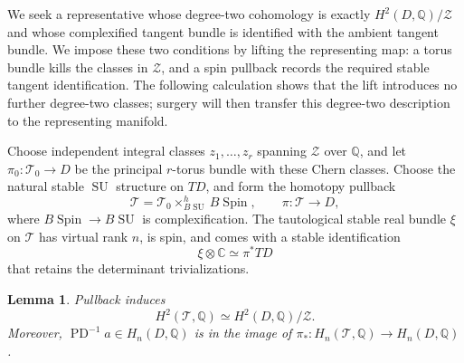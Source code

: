 \documentclass[11pt]{article}
\numberwithin{equation}{section}
\newtheorem{lemma}[theorem]{Lemma}
\theoremstyle{definition}
\theoremstyle{remark}
\begin{document}
We seek a representative whose degree-two cohomology is exactly
$H^2(D,\mathbb Q)/\mathcal Z$ and whose complexified tangent bundle is
identified with the ambient tangent bundle.  We impose these two
conditions by lifting the representing map: a torus bundle kills
the classes in $\mathcal Z$, and a spin pullback records the required
stable tangent identification.  The following calculation shows that
the lift introduces no further degree-two classes; surgery will then
transfer this degree-two description to the representing manifold.

Choose independent integral classes $z_1,\ldots,z_r$ spanning
$\mathcal Z$ over $\mathbb Q$, and let
$\pi_0:\mathscr T_0\to D$ be the principal $r$-torus bundle with these
Chern classes.  Choose the natural stable $\operatorname{SU}$ structure on $TD$, and
form the homotopy pullback
\[
 \mathscr T=\mathscr T_0\times^{h}_{B\operatorname{SU}}B\operatorname{Spin},
 \qquad \pi:\mathscr T\longrightarrow D,
\]
where $B\operatorname{Spin}\to B\operatorname{SU}$ is complexification.  The tautological stable
real bundle $\xi$ on $\mathscr T$ has virtual rank $n$, is spin, and
comes with a stable identification
\begin{equation}\label{topo:tautological}
 \xi\otimes\mathbb C\simeq\pi^*TD
\end{equation}
that retains the determinant trivializations.

\begin{lemma}\label{topo:lift}
Pullback induces
\[
 H^2(\mathscr T,\mathbb Q)\simeq H^2(D,\mathbb Q)/\mathcal Z.
\]
Moreover, $\operatorname{PD}^{-1}a\in H_n(D,\mathbb Q)$ is in the image of
$\pi_*:H_n(\mathscr T,\mathbb Q)\to H_n(D,\mathbb Q)$.
\end{lemma}
\end{document}
